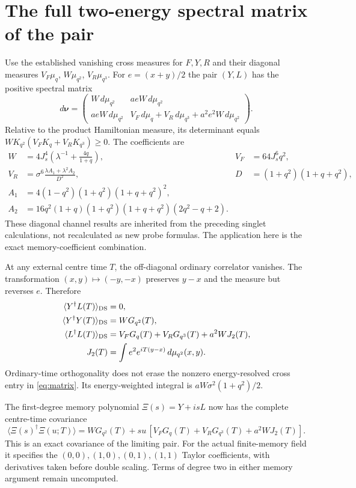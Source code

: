 \documentclass[11pt,a4paper]{article}
\newcommand{\av}[1]{\langle #1\rangle}
\begin{document}
\newpage
\section{The full two-energy spectral matrix of the pair}
Use the established vanishing cross measures for $F,Y,R$ and their
diagonal measures $V_F\mu_q$, $W\mu_{q^2}$, $V_R\mu_{q^3}$.
For $e=(x+y)/2$ the pair $(Y,L)$ has the positive spectral matrix
\begin{equation}\label{eq:matrix}
 d\boldsymbol\nu=
 \begin{pmatrix}
 W\,d\mu_{q^2}&a eW\,d\mu_{q^2}\\
 a eW\,d\mu_{q^2}&V_F\,d\mu_q+V_R\,d\mu_{q^3}
                  +a^2e^2W\,d\mu_{q^2}
 \end{pmatrix}.
\end{equation}
Relative to the product Hamiltonian measure, its determinant equals
$WK_{q^2}(V_FK_q+V_RK_{q^3})\geq0$. The coefficients are
\begin{align}
 W&=4J_s^4\left(\lambda^{-1}+\frac{4q}{1+q}\right),&
 V_F&=64J_s^6q^2,\\
 V_R&=\sigma^6\frac{\lambda A_1+\lambda^2A_2}{D^2},&
 D&=(1+q^2)(1+q+q^2),\\
 A_1&=4(1-q^2)(1+q^2)(1+q+q^2)^2,\nonumber\\
 A_2&=16q^2(1+q)(1+q^2)(1+q+q^2)(2q^2-q+2).\nonumber
\end{align}
These diagonal channel results are inherited from the preceding
singlet calculations, not recalculated as new probe formulas.
The application here is the exact memory-coefficient combination.

At any external centre time $T$, the off-diagonal ordinary correlator
vanishes. The transformation $(x,y)\mapsto(-y,-x)$ preserves $y-x$
and the measure but reverses $e$. Therefore
\begin{align}
 \av{Y^\dagger L(T)}_{\rm DS}&=0,\\
 \av{Y^\dagger Y(T)}_{\rm DS}&=WG_{q^2}(T),\\
 \av{L^\dagger L(T)}_{\rm DS}&=V_FG_q(T)+V_RG_{q^3}(T)+a^2WJ_2(T),\\
 J_2(T)&=\int e^2e^{iT(y-x)}\,d\mu_{q^2}(x,y).
\end{align}
Ordinary-time orthogonality does not erase the nonzero energy-resolved
cross entry in \eqref{eq:matrix}. Its energy-weighted integral is
$aW\sigma^2(1+q^2)/2$.

The first-degree memory polynomial $\Xi(s)=Y+isL$ now has the
complete centre-time covariance
\begin{equation}
 \av{\Xi(s)^\dagger\Xi(u;T)}=
 WG_{q^2}(T)+su\,[V_FG_q(T)+V_RG_{q^3}(T)+a^2WJ_2(T)].
\end{equation}
This is an exact covariance of the limiting pair. For the actual
finite-memory field it specifies the $(0,0),(1,0),(0,1),(1,1)$
Taylor coefficients, with derivatives taken before double scaling.
Terms of degree two in either memory argument remain uncomputed.
\end{document}
